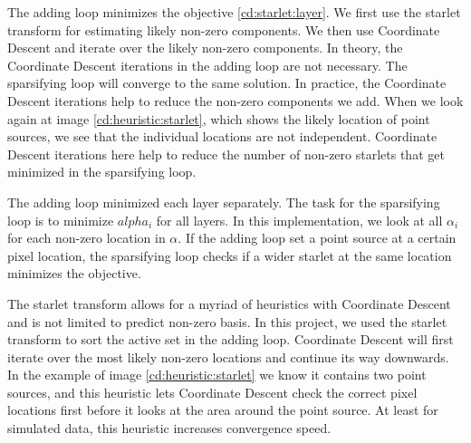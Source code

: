 The adding loop minimizes the objective \eqref{cd:starlet:layer}. We first use the starlet transform for estimating likely non-zero components. We then use Coordinate Descent and iterate over the likely non-zero components. In theory, the Coordinate Descent iterations in the adding loop are not necessary. The sparsifying loop will converge to the same solution. In practice, the Coordinate Descent iterations help to reduce the non-zero components we add. When we look again at image \ref{cd:heuristic:starlet}, which shows the likely location of point sources, we see that the individual locations are not independent. Coordinate Descent iterations here help to reduce the number of non-zero starlets that get minimized in the sparsifying loop.

The adding loop minimized each layer separately. The task for the sparsifying loop is to minimize $alpha_i$ for all layers. In this implementation, we look at all $\alpha_i$ for each non-zero location in $\alpha$. If the adding loop set a point source at a certain pixel location, the sparsifying loop checks if a wider starlet at the same location minimizes the objective. 

The starlet transform allows for a myriad of heuristics with Coordinate Descent and is not limited to predict non-zero basis. In this project, we used the starlet transform to sort the active set in the adding loop. Coordinate Descent will first iterate over the most likely non-zero locations and continue its way downwards. In the example of image \ref{cd:heuristic:starlet} we know it contains two point sources, and this heuristic lets Coordinate Descent check the correct pixel locations first before it looks at the area around the point source. At least for simulated data, this heuristic increases convergence speed.







